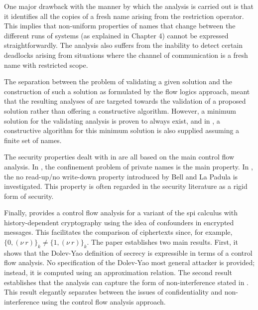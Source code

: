 \documentclass[10pt,a4paper,final,oneside,fleqn]{book}
\begin{document}
One major drawback with the manner by which the analysis is carried out is that it identifies all the copies of a fresh name arising from the restriction operator.  This implies that non-uniform properties of names that change between the different runs of systems (as explained in Chapter 4) cannot be expressed straightforwardly.  The analysis also suffers from the inability to detect certain deadlocks arising from situations where the channel of communication is a fresh name with restricted scope.

The separation between the problem of validating a given solution and the construction of such a solution as formulated by the flow logics approach, meant that the resulting analyses of \cite{bodei1,bodei2} are targeted towards the validation of a proposed solution rather than offering a constructive algorithm.  However, a minimum solution for the validating analysis is proven to always exist, and in \cite{bodei3}, a constructive algorithm for this minimum solution is also supplied assuming a finite set of names.

The security properties dealt with in \cite{bodei1,bodei2} are all based on the main control flow analysis.  In \cite{bodei1}, the confinement problem of private names is the main property.  In \cite{bodei2}, the no read-up/no write-down property introduced by Bell and La Padula \cite{bell1} is investigated.  This property is often regarded in the security literature as a rigid form of security.

Finally, \cite{bodei4} provides a control flow analysis for a variant of the spi calculus with history-dependent cryptography using the idea of confounders in encrypted messages.  This facilitates the comparison of ciphertexts since, for example, $\{0,(\nu~\!r)\}_k\ne\{1,(\nu~\!r)\}_k$.  The paper establishes two main results.  First, it shows that the Dolev-Yao definition of secrecy \cite{dolev1} is expressible in terms of a control flow analysis.  No specification of the Dolev-Yao most general attacker is provided; instead, it is computed using an approximation relation.  The second result establishes that the analysis can capture the form of non-interference stated in \cite{abadi3}.  This result elegantly separates between the issues of confidentiality and non-interference using the control flow analysis approach.
\end{document}
